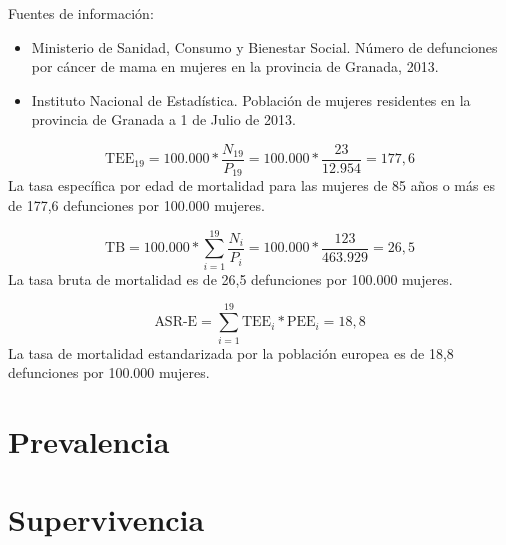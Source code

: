 \vspace{-0.5cm}
\noindent Fuentes de información:
\begin{itemize}
	\item Ministerio de Sanidad, Consumo y Bienestar Social. Número de defunciones por cáncer de mama en mujeres en la provincia de Granada, 2013.
	\item Instituto Nacional de Estadística. Población de mujeres residentes en la provincia de Granada a 1 de Julio de 2013.
\end{itemize}

$$\text{TEE}_{19} = 100.000 * \dfrac{N_{19}}{P_{19}} = 100.000 *  \frac{23}{12.954}  = 177,6 $$ La tasa específica por edad de mortalidad para las mujeres de 85 años o más es de 177,6 defunciones por 100.000 mujeres.

$$\text{TB} = 100.000 * \sum_{i=1}^{19} \dfrac{N_i}{P_i} = 100.000 *  \frac{123}{463.929}  = 26,5 $$ La tasa bruta de mortalidad es de 26,5 defunciones por 100.000 mujeres.

$$\text{ASR-E} = \sum_{i=1}^{19} \text{TEE}_i * \text{PEE}_i  = 18,8$$ La tasa de mortalidad estandarizada por la población europea es de 18,8 defunciones por 100.000 mujeres. \\

\section{Prevalencia}

\section{Supervivencia}
